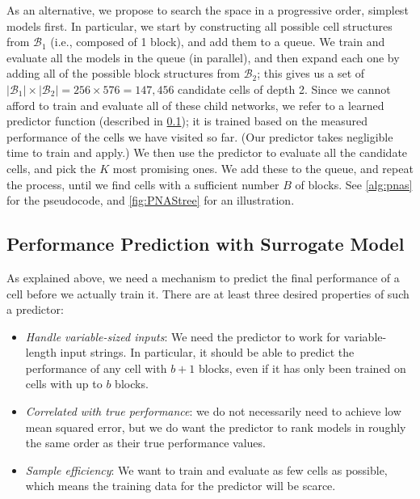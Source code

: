 \documentclass[runningheads]{llncs}
\begin{document}
As an alternative, we propose to search the space in a progressive order,
simplest models first.
In particular, we start by constructing all possible cell structures 
from $\mathcal{B}_1$ (i.e., composed of 1 block),
and add them to a queue.
We train and evaluate all the models in the queue (in parallel),
and then expand each one by
adding all of the possible  block structures from $\mathcal{B}_2$;
this gives us a set of
$|\mathcal{B}_1| \times |\mathcal{B}_2| = 256 \times 576 = 147,456$ candidate cells of depth 2.
Since 
we cannot afford to 
train and evaluate  all of these child networks,
 we refer to a learned predictor function
(described in \cref{sec:surrogate});
it is trained based on the measured performance of the cells we have visited so far.
(Our predictor takes negligible time to train and apply.)
We then use the predictor to evaluate all the candidate cells,
and pick the $K$ most promising ones.
We add these to the queue, and repeat the process,
until we find cells with a sufficient number $B$ of blocks.
See \cref{alg:pnas} for the pseudocode,
and \cref{fig:PNAStree} for an illustration.

\subsection{Performance Prediction with Surrogate Model}\label{sec:surrogate}As explained above, we need a mechanism to predict the final
performance of a cell before we actually train it.
There are at least three desired properties of such a predictor:
\begin{itemize}
    \item \textit{Handle variable-sized inputs}: We need the predictor to work for variable-length input strings.
    In particular, it should be able to predict the performance of any cell with $b+1$ blocks, even if it has only been trained on cells with up to $b$ blocks.
    
  
  \item \textit{Correlated with  true performance}: we do not necessarily need to achieve low mean squared error, but we do want the predictor to rank models in roughly the same order as their true performance values.
 
    
    \item \textit{Sample efficiency}: We want to train and evaluate as few cells as possible, which means the training data for the predictor will be scarce. 
\end{itemize}
\end{document}
